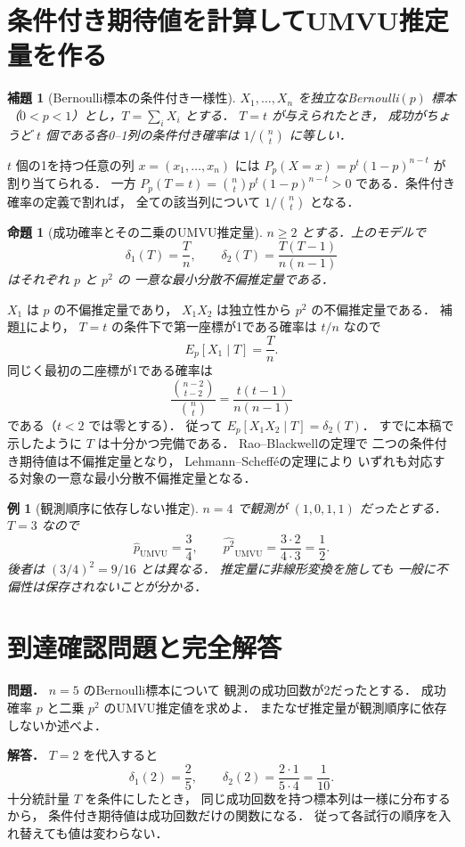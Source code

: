 \documentclass[a5paper,10pt,onecolumn]{jsarticle}
\makeatletter
\theoremstyle{mathnotetheorem}
\newtheorem{lemma}[theorem]{補題}
\newtheorem{proposition}[theorem]{命題}
\newtheorem{example}[theorem]{例}
\renewcommand{\proofname}{証明}
\renewenvironment{proof}[1][\proofname]{%
  \par\pushQED{\qed}\normalfont\topsep4\p@\@plus2\p@\relax
  \trivlist\item[\hskip\labelsep\bfseries #1]\ignorespaces
}{\popQED\endtrivlist\@endpefalse}
\makeatother
\begin{document}
\section{条件付き期待値を計算してUMVU推定量を作る}
\begin{lemma}[Bernoulli標本の条件付き一様性]\label{lem:rb-uniform}
$X_1,\ldots,X_n$ を独立なBernoulli$(p)$ 標本
（$0<p<1$）とし，$T=\sum_iX_i$ とする．
$T=t$ が与えられたとき，
成功がちょうど $t$ 個である各0--1列の条件付き確率は
$1/\binom nt$ に等しい．
\end{lemma}
\begin{proof}
$t$ 個の1を持つ任意の列 $x=(x_1,\ldots,x_n)$ には
$P_p(X=x)=p^t(1-p)^{n-t}$ が割り当てられる．
一方
$P_p(T=t)=\binom ntp^t(1-p)^{n-t}>0$
である．条件付き確率の定義で割れば，
全ての該当列について $1/\binom nt$ となる．
\end{proof}
\begin{proposition}[成功確率とその二乗のUMVU推定量]
$n\ge2$ とする．上のモデルで
\[
 \delta_1(T)=\frac Tn,\qquad
 \delta_2(T)=\frac{T(T-1)}{n(n-1)}
\]
はそれぞれ $p$ と $p^2$ の
一意な最小分散不偏推定量である．
\end{proposition}
\begin{proof}
$X_1$ は $p$ の不偏推定量であり，
$X_1X_2$ は独立性から $p^2$ の不偏推定量である．
補題\ref{lem:rb-uniform}により，
$T=t$ の条件下で第一座標が1である確率は
$t/n$ なので
\[
 E_p[X_1\mid T]=\frac Tn.
\]
同じく最初の二座標が1である確率は
\[
 \frac{\binom{n-2}{t-2}}{\binom nt}
 =\frac{t(t-1)}{n(n-1)}
\]
である（$t<2$ では零とする）．
従って
$E_p[X_1X_2\mid T]=\delta_2(T)$．
すでに本稿で示したように
$T$ は十分かつ完備である．
Rao--Blackwellの定理で
二つの条件付き期待値は不偏推定量となり，
Lehmann--Scheff\'eの定理により
いずれも対応する対象の一意な最小分散不偏推定量となる．
\end{proof}
\begin{example}[観測順序に依存しない推定]
$n=4$ で観測が $(1,0,1,1)$ だったとする．
$T=3$ なので
\[
 \widehat p_{\mathrm{UMVU}}=\frac34,\qquad
 \widehat{p^2}_{\mathrm{UMVU}}
 =\frac{3\cdot2}{4\cdot3}=\frac12.
\]
後者は $(3/4)^2=9/16$ とは異なる．
推定量に非線形変換を施しても
一般に不偏性は保存されないことが分かる．
\end{example}
\section*{到達確認問題と完全解答}
\noindent\textbf{問題．}
$n=5$ のBernoulli標本について
観測の成功回数が2だったとする．
成功確率 $p$ と二乗 $p^2$ のUMVU推定値を求めよ．
またなぜ推定量が観測順序に依存しないか述べよ．

\medskip\noindent\textbf{解答．}
$T=2$ を代入すると
\[
 \delta_1(2)=\frac25,\qquad
 \delta_2(2)=\frac{2\cdot1}{5\cdot4}=\frac1{10}.
\]
十分統計量 $T$ を条件にしたとき，
同じ成功回数を持つ標本列は一様に分布するから，
条件付き期待値は成功回数だけの関数になる．
従って各試行の順序を入れ替えても値は変わらない．
\end{document}
